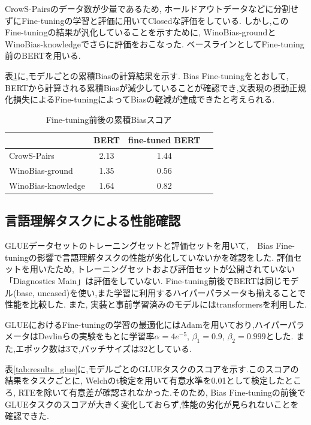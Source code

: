 \documentclass[
  platex, dvipdfmx %
]{nlp2021}
\begin{document}
CrowS-Pairsのデータ数が少量であるため, ホールドアウトデータなどに分割せずにFine-tuningの学習と評価に用いてClosedな評価をしている.
しかし,このFine-tuningの結果が汎化していることを示すために, WinoBias-groundとWinoBias-knowledgeでさらに評価をおこなった.
ベースラインとしてFine-tuning前のBERTを用いる.

表\ref{tab:results_bias}に,モデルごとの累積Biasの計算結果を示す.
Bias Fine-tuningをとおして, BERTから計算される累積Biasが減少していることが確認でき,文表現の摂動正規化損失によるFine-tuningによってBiasの軽減が達成できたと考えられる.

\begin{table}[h]
\centering
\begin{tabular}{lccc}
\hline
 &  BERT & fine-tuned BERT \\
\hline
CrowS-Pairs & 2.13 &  1.44 \\
WinoBias-ground & 1.35 &  0.56  \\
WinoBias-knowledge & 1.64 & 0.82 \\
\hline
\end{tabular}
\caption{Fine-tuning前後の累積Biasスコア}
\label{tab:results_bias}
\end{table}

\subsection{言語理解タスクによる性能確認}
GLUEデータセットのトレーニングセットと評価セットを用いて,　Bias Fine-tuningの影響で言語理解タスクの性能が劣化していないかを確認をした.
評価セットを用いたため, トレーニングセットおよび評価セットが公開されていない「Diagnostics Main」は評価をしていない.
Fine-tuning前後でBERTは同じモデル(base, uncased)を使い,また学習に利用するハイパーパラメータも揃えることで性能を比較した.
また, 実装と事前学習済みのモデルにはtransformers\cite{wolf-etal-2020-transformers}を利用した.

GLUEにおけるFine-tuningの学習の最適化にはAdamを用いており,ハイパーパラメータはDevlinら\cite{devlin2018bert}の実験をもとに学習率$\alpha = 4e^{-5}$, $\beta_1 = 0.9$, $\beta_2 = 0.999$とした.
また,エポック数は3で,バッチサイズは32としている.

表\ref{tab:results_glue}に,モデルごとのGLUEタスクのスコアを示す.このスコアの結果をタスクごとに, Welchのt検定を用いて有意水準を0.01として検定したところ, RTEを除いて有意差が確認されなかった.そのため, Bias Fine-tuningの前後でGLUEタスクのスコアが大きく変化しておらず,性能の劣化が見られないことを確認できた.
\end{document}
